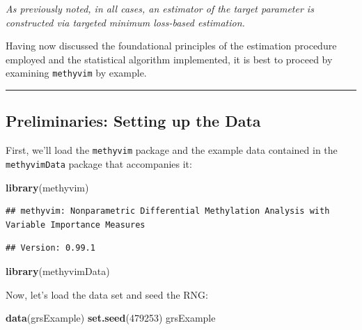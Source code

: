 \documentclass[9pt,a4paper,]{extarticle}
\newenvironment{Shaded}{\begin{snugshade}}{\end{snugshade}}
\newcommand{\KeywordTok}[1]{\textcolor[rgb]{0.13,0.29,0.53}{\textbf{#1}}}
\newcommand{\DecValTok}[1]{\textcolor[rgb]{0.00,0.00,0.81}{#1}}
\newcommand{\NormalTok}[1]{#1}
\theoremstyle{definition}
\theoremstyle{definition}
\theoremstyle{definition}
\theoremstyle{remark}
\begin{document}
\emph{As previously noted, in all cases, an estimator of the target
parameter is constructed via targeted minimum loss-based estimation.}

Having now discussed the foundational principles of the estimation
procedure employed and the statistical algorithm implemented, it is best
to proceed by examining \texttt{methyvim} by example.

\begin{center}\rule{0.5\linewidth}{\linethickness}\end{center}

\subsection{Preliminaries: Setting up the
Data}\label{preliminaries-setting-up-the-data}

First, we'll load the \texttt{methyvim} package and the example data
contained in the \texttt{methyvimData} package that accompanies it:

\begin{Shaded}
\begin{Highlighting}[]
\KeywordTok{library}\NormalTok{(methyvim)}
\end{Highlighting}
\end{Shaded}

\begin{verbatim}
## methyvim: Nonparametric Differential Methylation Analysis with Variable Importance Measures
\end{verbatim}

\begin{verbatim}
## Version: 0.99.1
\end{verbatim}

\begin{Shaded}
\begin{Highlighting}[]
\KeywordTok{library}\NormalTok{(methyvimData)}
\end{Highlighting}
\end{Shaded}

Now, let's load the data set and seed the RNG:

\begin{Shaded}
\begin{Highlighting}[]
\KeywordTok{data}\NormalTok{(grsExample)}
\KeywordTok{set.seed}\NormalTok{(}\DecValTok{479253}\NormalTok{)}
\NormalTok{grsExample}
\end{Highlighting}
\end{Shaded}
\end{document}
